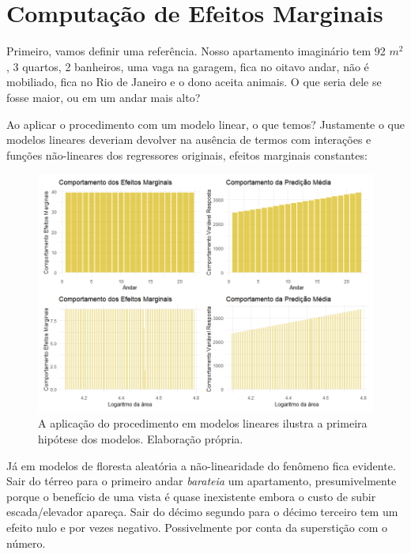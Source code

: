 



\section{Computação de Efeitos Marginais}

Primeiro, vamos definir uma referência. Nosso apartamento imaginário tem 92 $m^2$, 3 quartos, 2 banheiros, uma vaga na garagem, fica no oitavo andar, não é mobiliado, fica no Rio de Janeiro e o dono aceita animais. O que seria dele se fosse maior, ou em um andar mais alto?

Ao aplicar o procedimento com um modelo linear, o que temos? Justamente o que modelos lineares deveriam devolver na ausência de termos com interações e funções não-lineares dos regressores originais, efeitos marginais constantes:

\begin{figure}[H]
    \centering
    \includegraphics[scale = .68]{imagens/efeitos_marginais_lm.png}
    \caption{A aplicação do procedimento em modelos lineares ilustra a primeira hipótese dos modelos. Elaboração própria.}
\end{figure}

Já em modelos de floresta aleatória a não-linearidade do fenômeno fica evidente. Sair do térreo para o primeiro andar \textit{barateia} um apartamento, presumivelmente porque o benefício de uma vista é quase inexistente embora o custo de subir escada/elevador apareça. Sair do décimo segundo para o décimo terceiro tem um efeito nulo e por vezes negativo. Possivelmente por conta da superstição com o número.


